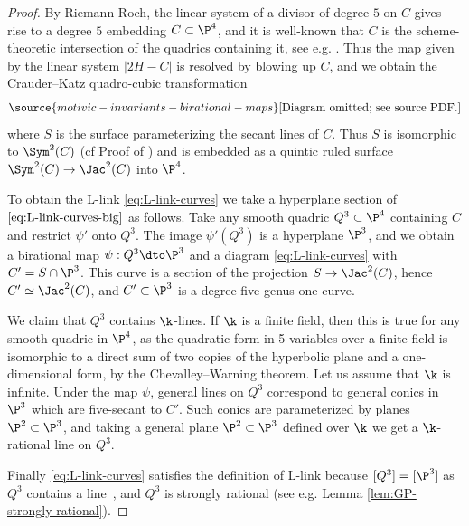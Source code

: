 \begin{proof}
By Riemann-Roch, the linear
system of a divisor
of degree $5$ on $C$
gives rise to a degree $5$ embedding $C \subset \P^4$,
and it is well-known that
$C$ is the scheme-theoretic intersection
of the quadrics containing it, see e.g. \cite[Proposition 4.2(ii)]{Fisher-quintics}.
Thus the map given by the linear system $|2H - C|$
is resolved by blowing up $C$, and we obtain
the Crauder--Katz quadro-cubic transformation \cite[Theorem 2.2(ii)]{Crauder-Katz}
\begin{equation}\label{eq:L-link-curves-big}
\source{motivic-invariants-birational-maps}
 \text{[Diagram omitted; see source PDF.]}
\end{equation}
where $S$ is the surface
parameterizing the secant lines of $C$.
Thus $S$ is isomorphic to $\Sym^2(C)$
(cf Proof of \cite[Theorem 3.3(A)]{Crauder-Katz})
and
is embedded as a quintic ruled surface $\Sym^2(C) \to \Jac^2(C)$
into $\P^4$.

To obtain the L-link
\eqref{eq:L-link-curves} we take a hyperplane
section of $\eqref{eq:L-link-curves-big}$ as follows.
Take any smooth quadric $Q^3 \subset \P^4$ containing $C$
and restrict $\psi'$ onto $Q^3$.
The image $\psi'(Q^3)$
is a hyperplane $\P^3$,
and we obtain a birational map $\psi: Q^3 \dto \P^3$ and a diagram
\eqref{eq:L-link-curves} with $C' = S \cap \P^3$.
This curve is a section of the projection $S \to \Jac^2(C)$,
hence $C' \simeq \Jac^2(C)$,
and $C' \subset \P^3$
is a degree five genus one curve.

We claim that $Q^3$ contains $\k$-lines.
If $\k$ is a finite field, then this is true
for any smooth quadric in $\P^4$, as the quadratic form
in 5 variables over a finite field is isomorphic to a direct
sum of two copies of the hyperbolic plane and a one-dimensional
form, by the Chevalley--Warning theorem.
Let us assume that $\k$ is infinite.
Under the map $\psi$, general lines on $Q^3$ correspond to general
conics in $\P^3$ which are five-secant to $C'$. Such conics
are parameterized by planes $\P^2 \subset \P^3$, and taking
a general
plane $\P^2 \subset \P^3$
defined over $\k$ we get a $\k$-rational line on $Q^3$.


Finally \eqref{eq:L-link-curves}
satisfies the definition of L-link
because $[Q^3] = [\P^3]$ as $Q^3$
contains a line~\cite[Example 2.8]{KuznetsovShinder},
and
$Q^3$
is strongly rational
(see e.g. Lemma \ref{lem:GP-strongly-rational}).
\end{proof}


